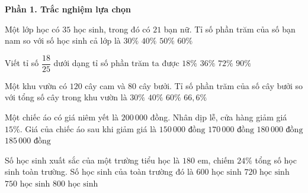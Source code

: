 \textbf{Phần 1. Trắc nghiệm lựa chọn}

\begin{ex} %
Một lớp học có $35$ học sinh, trong đó có $21$ bạn nữ. Tỉ số phần trăm của số bạn nam so với số học sinh cả lớp là
\choice
{$30\%$}
{\True $40\%$}
{$50\%$}
{$60\%$}
\end{ex}

\begin{ex} %
Viết tỉ số $\dfrac{18}{25}$ dưới dạng tỉ số phần trăm ta được
\choice
{$18\%$}
{$36\%$}
{\True $72\%$}
{$90\%$}
\end{ex}

\begin{ex} %
Một khu vườn có $120$ cây cam và $80$ cây bưởi. Tỉ số phần trăm của số cây bưởi so với tổng số cây trong khu vườn là
\choice
{$30\%$}
{\True $40\%$}
{$60\%$}
{$66{,}6\%$}
\end{ex}

\begin{ex} %
Một chiếc áo có giá niêm yết là $200\,000$ đồng. Nhân dịp lễ, cửa hàng giảm giá $15\%$. Giá của chiếc áo sau khi giảm giá là
\choice
{$150\,000\text{ đồng}$}
{\True $170\,000\text{ đồng}$}
{$180\,000\text{ đồng}$}
{$185\,000\text{ đồng}$}
\end{ex}

\begin{ex} %
Số học sinh xuất sắc của một trường tiểu học là $180$ em, chiếm $24\%$ tổng số học sinh toàn trường. Số học sinh của toàn trường đó là
\choice
{$600\text{ học sinh}$}
{$720\text{ học sinh}$}
{\True $750\text{ học sinh}$}
{$800\text{ học sinh}$}
\end{ex}

